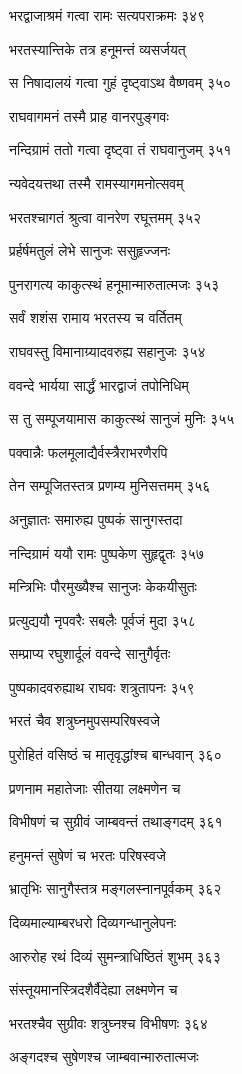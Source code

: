 भरद्वाजाश्रमं गत्वा रामः सत्यपराक्रमः ३४९

भरतस्यान्तिके तत्र हनूमन्तं व्यसर्जयत्

स निषादालयं गत्वा गुहं दृष्ट्वाऽथ वैष्णवम् ३५०

राघवागमनं तस्मै प्राह वानरपुङ्गवः

नन्दिग्रामं ततो गत्वा दृष्ट्वा तं राघवानुजम् ३५१

न्यवेदयत्तथा तस्मै रामस्यागमनोत्सवम्

भरतश्चागतं श्रुत्वा वानरेण रघूत्तमम् ३५२

प्रर्हर्षमतुलं लेभे सानुजः ससुहृज्जनः

पुनरागत्य काकुत्स्थं हनूमान्मारुतात्मजः ३५३

सर्वं शशंस रामाय भरतस्य च वर्तितम्

राघवस्तु विमानाग्र्यादवरुह्य सहानुजः ३५४

ववन्दे भार्यया सार्द्धं भारद्वाजं तपोनिधिम्

स तु सम्पूजयामास काकुत्स्थं सानुजं मुनिः ३५५

पक्वान्नैः फलमूलाद्यैर्वस्त्रैराभरणैरपि

तेन सम्पूजितस्तत्र प्रणम्य मुनिसत्तमम् ३५६

अनुज्ञातः समारुह्य पुष्पकं सानुगस्तदा

नन्दिग्रामं ययौ रामः पुष्पकेण सुहृद्वृतः ३५७

मन्त्रिभिः पौरमुख्यैश्च सानुजः केकयीसुतः

प्रत्युद्ययौ नृपवरैः सबलैः पूर्वजं मुदा ३५८

सम्प्राप्य रघुशार्दूलं ववन्दे सानुगैर्वृतः

पुष्पकादवरुह्याथ राघवः शत्रुतापनः ३५९

भरतं चैव शत्रुघ्नमुपसम्परिषस्वजे

पुरोहितं वसिष्ठं च मातृवृद्धांश्च बान्धवान् ३६०

प्रणनाम महातेजाः सीतया लक्ष्मणेन च

विभीषणं च सुग्रीवं जाम्बवन्तं तथाङ्गदम् ३६१

हनुमन्तं सुषेणं च भरतः परिषस्वजे

भ्रातृभिः सानुगैस्तत्र मङ्गलस्नानपूर्वकम् ३६२

दिव्यमाल्याम्बरधरो दिव्यगन्धानुलेपनः

आरुरोह रथं दिव्यं सुमन्त्राधिष्ठितं शुभम् ३६३

संस्तूयमानस्त्रिदशैर्वैदेह्या लक्ष्मणेन च

भरतश्चैव सुग्रीवः शत्रुघ्नश्च विभीषणः ३६४

अङ्गदश्च सुषेणश्च जाम्बवान्मारुतात्मजः

